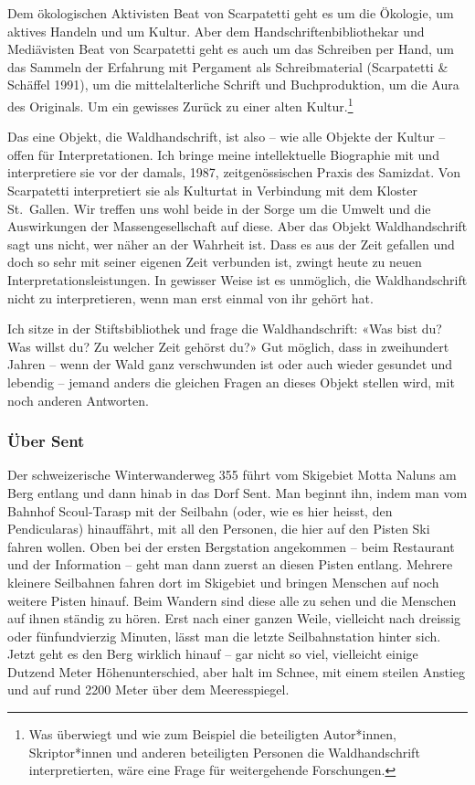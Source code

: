 \documentclass[a4paper,
fontsize=11pt,
oneside,
numbers=noperiodatend,
parskip=half-,
bibliography=totoc,
final
]{scrartcl}
\begin{document}
Dem ökologischen Aktivisten Beat von Scarpatetti geht es um die
Ökologie, um aktives Handeln und um Kultur. Aber dem
Handschriftenbibliothekar und Mediävisten Beat von Scarpatetti geht es
auch um das Schreiben per Hand, um das Sammeln der Erfahrung mit
Pergament als Schreibmaterial (Scarpatetti \& Schäffel 1991), um die
mittelalterliche Schrift und Buchproduktion, um die Aura des Originals.
Um ein gewisses Zurück zu einer alten Kultur.\footnote{Was überwiegt und
  wie zum Beispiel die beteiligten Autor*innen, Skriptor*innen und
  anderen beteiligten Personen die Waldhandschrift interpretierten, wäre
  eine Frage für weitergehende Forschungen.}

Das eine Objekt, die Waldhandschrift, ist also -- wie alle Objekte der
Kultur -- offen für Interpretationen. Ich bringe meine intellektuelle
Biographie mit und interpretiere sie vor der damals, 1987,
zeitgenössischen Praxis des Samizdat. Von Scarpatetti interpretiert sie als
Kulturtat in Verbindung mit dem Kloster St.~Gallen. Wir treffen uns wohl
beide in der Sorge um die Umwelt und die Auswirkungen der
Massengesellschaft auf diese. Aber das Objekt Waldhandschrift sagt uns
nicht, wer näher an der Wahrheit ist. Dass es aus der Zeit gefallen und
doch so sehr mit seiner eigenen Zeit verbunden ist, zwingt heute zu
neuen Interpretationsleistungen. In gewisser Weise ist es unmöglich, die
Waldhandschrift nicht zu interpretieren, wenn man erst einmal von ihr
gehört hat.

Ich sitze in der Stiftsbibliothek und frage die Waldhandschrift: «Was
bist du? Was willst du? Zu welcher Zeit gehörst du?» Gut möglich, dass
in zweihundert Jahren -- wenn der Wald ganz verschwunden ist oder auch
wieder gesundet und lebendig -- jemand anders die gleichen Fragen an
dieses Objekt stellen wird, mit noch anderen Antworten.

\subsubsection{Über Sent}\label{uxfcber-sent}

Der schweizerische Winterwanderweg 355 führt vom Skigebiet Motta Naluns
am Berg entlang und dann hinab in das Dorf Sent. Man beginnt ihn, indem
man vom Bahnhof Scoul-Tarasp mit der Seilbahn (oder, wie es hier heisst,
den Pendicularas) hinauffährt, mit all den Personen, die hier auf den
Pisten Ski fahren wollen. Oben bei der ersten Bergstation angekommen --
beim Restaurant und der Information -- geht man dann zuerst an diesen
Pisten entlang. Mehrere kleinere Seilbahnen fahren dort im Skigebiet und
bringen Menschen auf noch weitere Pisten hinauf. Beim Wandern sind diese
alle zu sehen und die Menschen auf ihnen ständig zu hören. Erst nach
einer ganzen Weile, vielleicht nach dreissig oder fünfundvierzig
Minuten, lässt man die letzte Seilbahnstation hinter sich. Jetzt geht es
den Berg wirklich hinauf -- gar nicht so viel, vielleicht einige Dutzend
Meter Höhenunterschied, aber halt im Schnee, mit einem steilen Anstieg
und auf rund 2200 Meter über dem Meeresspiegel.
\end{document}
